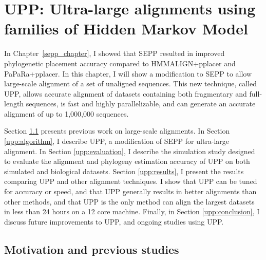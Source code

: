 \chapter{UPP: Ultra-large alignments using families of Hidden Markov Model}\label{upp_chapter}
%


In Chapter~\ref{sepp_chapter}, I showed that SEPP resulted in improved phylogenetic placement accuracy compared to HMMALIGN+pplacer and PaPaRa+pplacer.  In this chapter, I will show a modification to SEPP to allow large-scale alignment of a set of unaligned sequences.  This new technique, called UPP, allows accurate alignment of datasets containing both fragmentary and full-length sequences, is fast and highly parallelizable, and can generate an accurate alignment of up to 1,000,000 sequences.

Section \ref{upp:motivation} presents previous work on large-scale alignments.  In Section \ref{upp:algorithm}, I describe UPP, a modification of SEPP for ultra-large alignment.  In Section \ref{upp:evaluation}, I describe the simulation study designed to evaluate the alignment and phylogeny estimation accuracy of UPP on both simulated and biological datasets.  Section \ref{upp:results}, I present the results comparing UPP and other alignment techniques.  I show that UPP can be tuned for accuracy or speed, and that UPP generally results in better alignments than other methods, and that UPP is the only method can align the largest datasets in less than 24 hours on a 12 core machine.  Finally, in Section \ref{upp:conclusion}, I discuss future improvements to UPP, and ongoing studies using UPP.


\section{Motivation and previous studies}\label{upp:motivation}

